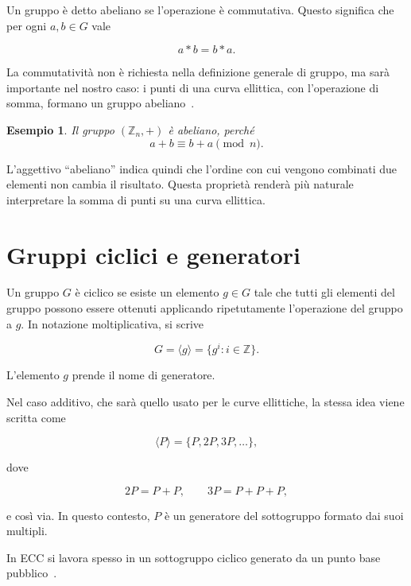 \documentclass[12pt,a4paper,oneside]{report}
\newtheorem{example}{Esempio}[chapter]
\begin{document}
Un gruppo è detto abeliano se l'operazione è commutativa. Questo significa che per ogni \(a,b \in G\) vale

\begin{equation}
    a \ast b = b \ast a.
\end{equation}

La commutatività non è richiesta nella definizione generale di gruppo, ma sarà importante nel nostro caso: i punti di una curva ellittica, con l'operazione di somma, formano un gruppo abeliano~\cite{margara_ec}.

\begin{example}
Il gruppo \((\mathbb{Z}_n,+)\) è abeliano, perché
\[
a+b \equiv b+a \pmod n.
\]
\end{example}

L'aggettivo ``abeliano'' indica quindi che l'ordine con cui vengono combinati due elementi non cambia il risultato. Questa proprietà renderà più naturale interpretare la somma di punti su una curva ellittica.

\section{Gruppi ciclici e generatori}

Un gruppo \(G\) è ciclico se esiste un elemento \(g \in G\) tale che tutti gli elementi del gruppo possono essere ottenuti applicando ripetutamente l'operazione del gruppo a \(g\). In notazione moltiplicativa, si scrive

\begin{equation}
    G = \langle g \rangle = \{g^i : i \in \mathbb{Z}\}.
\end{equation}

L'elemento \(g\) prende il nome di generatore.

Nel caso additivo, che sarà quello usato per le curve ellittiche, la stessa idea viene scritta come

\begin{equation}
    \langle P \rangle = \{P,2P,3P,\ldots\},
\end{equation}

dove

\[
2P = P+P, \qquad 3P = P+P+P,
\]

e così via. In questo contesto, \(P\) è un generatore del sottogruppo formato dai suoi multipli.

In ECC si lavora spesso in un sottogruppo ciclico generato da un punto base pubblico~\cite{margara_dh,margara_ec}.
\end{document}
